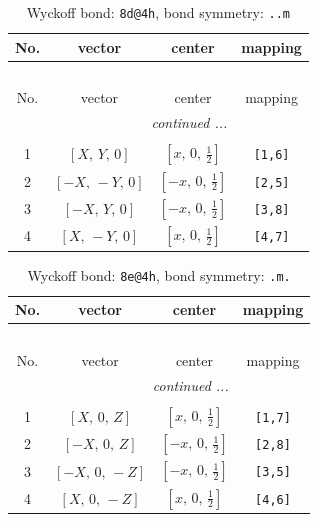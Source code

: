 \documentclass[fleqn,8pt]{jsarticle}
\begin{document}
\begin{longtable}{cccc}
\caption{Wyckoff bond: {\tt 8d@4h}, bond symmetry: {\tt ..m}}
 \\
 \hline \hline
No. & vector & center & mapping \\ \hline \endfirsthead

\multicolumn{3}{l}{\tablename\ \thetable{}} \\
 \hline \hline
No. & vector & center & mapping \\ \hline \endhead

 \hline \hline
\multicolumn{3}{r}{\footnotesize\it continued ...} \\ \endfoot

 \hline \hline
\multicolumn{3}{r}{} \\ \endlastfoot

1 & $\left[ X,\, Y,\, 0 \right]$ & $\left[ x,\, 0,\, \frac{1}{2} \right]$ & {\tt [1,6]} \\ \hline
2 & $\left[ - X,\, - Y,\, 0 \right]$ & $\left[ - x,\, 0,\, \frac{1}{2} \right]$ & {\tt [2,5]} \\ \hline
3 & $\left[ - X,\, Y,\, 0 \right]$ & $\left[ - x,\, 0,\, \frac{1}{2} \right]$ & {\tt [3,8]} \\ \hline
4 & $\left[ X,\, - Y,\, 0 \right]$ & $\left[ x,\, 0,\, \frac{1}{2} \right]$ & {\tt [4,7]} \\
\end{longtable}
\renewcommand{\arraystretch}{1.2}
\begin{longtable}{cccc}
\caption{Wyckoff bond: {\tt 8e@4h}, bond symmetry: {\tt .m.}}
 \\
 \hline \hline
No. & vector & center & mapping \\ \hline \endfirsthead

\multicolumn{3}{l}{\tablename\ \thetable{}} \\
 \hline \hline
No. & vector & center & mapping \\ \hline \endhead

 \hline \hline
\multicolumn{3}{r}{\footnotesize\it continued ...} \\ \endfoot

 \hline \hline
\multicolumn{3}{r}{} \\ \endlastfoot

1 & $\left[ X,\, 0,\, Z \right]$ & $\left[ x,\, 0,\, \frac{1}{2} \right]$ & {\tt [1,7]} \\ \hline
2 & $\left[ - X,\, 0,\, Z \right]$ & $\left[ - x,\, 0,\, \frac{1}{2} \right]$ & {\tt [2,8]} \\ \hline
3 & $\left[ - X,\, 0,\, - Z \right]$ & $\left[ - x,\, 0,\, \frac{1}{2} \right]$ & {\tt [3,5]} \\ \hline
4 & $\left[ X,\, 0,\, - Z \right]$ & $\left[ x,\, 0,\, \frac{1}{2} \right]$ & {\tt [4,6]} \\
\end{longtable}
\end{document}
